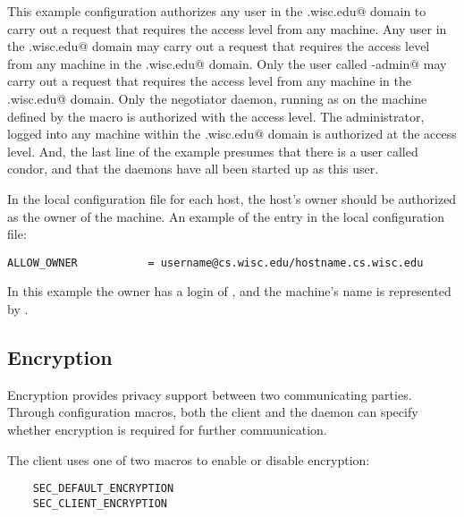 This example configuration authorizes
any user in the 
\verb@cs.wisc.edu@ domain to 
carry out a request that requires the 
 access level
from any machine.
Any user in the 
\verb@cs.wisc.edu@ domain may 
carry out a request that requires the 
 access level
from any machine in the
\verb@cs.wisc.edu@ domain.
Only the user called \verb@condor-admin@ may 
carry out a request that requires the 
 access level
from any machine in the
\verb@cs.wisc.edu@ domain.
Only the negotiator daemon, running as
\verb@condor@ on the machine defined by the
 macro is authorized 
with the
 access level.
The administrator, logged into any machine within
the \verb@cs.wisc.edu@ domain is authorized at the
 access level.
And, the last line of the example presumes that there is a
user called condor, and that the daemons have all been started
up as this user.

In the local configuration file for each host, the host's
owner should be authorized
as the owner of the machine.
An example of the entry in the local configuration file:
\footnotesize
\begin{verbatim}
ALLOW_OWNER           = username@cs.wisc.edu/hostname.cs.wisc.edu
\end{verbatim}
\normalsize
In this example the owner has a login of
\verb@username@, and the machine's name is represented by
\verb@hostname@.

\subsection{\label{sec:Security-Encryption}Encryption}
Encryption provides privacy support between two communicating parties.
Through configuration macros, both the client and the daemon
can specify whether encryption is required for further communication.

The client uses one of two macros to enable or disable encryption:
\begin{verbatim}
    SEC_DEFAULT_ENCRYPTION
    SEC_CLIENT_ENCRYPTION
\end{verbatim}

